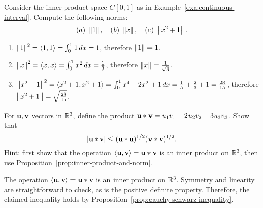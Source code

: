 \begin{ex}
  Consider the inner product space $C[0,1]$ as in
  Example~\ref{exa:continuous-interval}. Compute the following norms:
  \begin{equation*}
    (a)~ \left\|1\right\|, \quad
    (b)~ \left\|x\right\|, \quad
    (c)~ \left\|x^2+1\right\|.
  \end{equation*}
  \begin{sol}
    \begin{enumerate}
    \item $\left\|1\right\|^2 = \langle1,1\rangle = \int_{0}^{1} 1\,dx
      = 1$, therefore $\left\|1\right\|=1$.
    \item $\left\|x\right\|^2 = \langle x,x\rangle = \int_{0}^{1} x^2\,dx
      = \frac{1}{3}$, therefore $\left\|x\right\| = \frac{1}{\sqrt{3}}$.
    \item $\left\|x^2+1\right\|^2 = \langle x^2+1,x^2+1\rangle
      = \int_{0}^{1} x^4 + 2x^2 + 1\,dx
      = \frac{1}{5} + \frac{2}{3} + 1 = \frac{28}{15}$, therefore
      $\left\|x^2+1\right\| = \sqrt{\frac{28}{15}}$.
    \end{enumerate}
  \end{sol}
\end{ex}

\begin{ex}
  For $\vect{u},\vect{v}$ vectors in $\mathbb{R}^3$, define the product
  $\vect{u}\ast \vect{v} = u_1v_1+2u_2v_2+3u_3v_3$. Show
  that
  \begin{equation*}
    \abs{\vect{u}\ast \vect{v}} \leq (\vect{u}\ast \vect{u})^{1/2}
    (\vect{v}\ast \vect{v})^{1/2}.
  \end{equation*}
  Hint: first show that the operation
  $\iprod{\vect{u},\vect{v}}=\vect{u}\ast\vect{v}$ is an inner product
  on $\mathbb{R}^3$, then use Proposition~\ref{prop:inner-product-and-norm}.
  \begin{sol}
    The operation $\iprod{\vect{u},\vect{v}}=\vect{u}\ast\vect{v}$ is
    an inner product on $\mathbb{R}^3$. Symmetry and linearity are
    straightforward to check, as is the positive definite
    property. Therefore, the claimed inequality holds by
    Proposition~\ref{prop:cauchy-schwarz-inequality}.
  \end{sol}
\end{ex}

